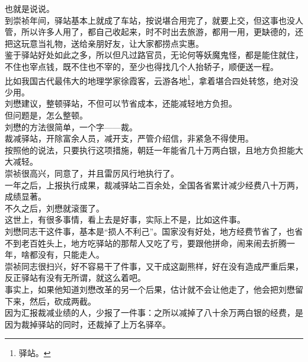 \begin{multicols}{\theparacolNo}
也就是说说。\\

到崇祯年间，驿站基本上就成了车站，按说堪合用完了，就要上交，但这事也没人管，所以许多人用了，都自己收起来，时不时出去旅游，都用一用，更缺德的，还把这玩意当礼物，送给亲朋好友，让大家都捞点实惠。\\

鉴于驿站好处如此之多，所以但凡过路官员，无论何等妖魔鬼怪，都是能住就住，不住也宰点钱，既不住也不宰的，至少也得找几个人抬轿子，顺便送一程。\\

比如我国古代最伟大的地理学家徐霞客，云游各地\footnote{驿站。}，拿着堪合四处转悠，绝对没少用。\\

刘懋建议，整顿驿站，不但可以节省成本，还能减轻地方负担。\\

但问题是，怎么整顿。\\

刘懋的方法很简单，一个字——裁。\\

裁减驿站，开除富余人员，减开支，严管介绍信，非紧急不得使用。\\

按照他的说法，只要执行这项措施，朝廷一年能省几十万两白银，且地方负担能大大减轻。\\

崇祯很高兴，同意了，并且雷厉风行地执行了。\\

一年之后，上报执行成果，裁减驿站二百余处，全国各省累计减少经费八十万两，成绩显著。\\

不久之后，刘懋就滚蛋了。\\

这世上，有很多事情，看上去是好事，实际上不是，比如这件事。\\

刘懋同志干这件事，基本是“损人不利己”。国家没有好处，地方经费节省了，也省不到老百姓头上，地方吃驿站的那帮人又吃了亏，要跟他拼命，闹来闹去折腾一年，啥都没有，只能走人。\\

崇祯同志很扫兴，好不容易干了件事，又干成这副熊样，好在没有造成严重后果，反正驿站有没有无所谓，就这么着吧。\\

事实上，如果他知道刘懋改革的另一个后果，估计就不会让他走了，他会把刘懋留下来，然后，砍成两截。\\

因为汇报裁减业绩的人，少报了一件事：之所以减掉了八十余万两白银的经费，是因为裁掉驿站的同时，还裁掉了上万名驿卒。\\


\end{multicols}
